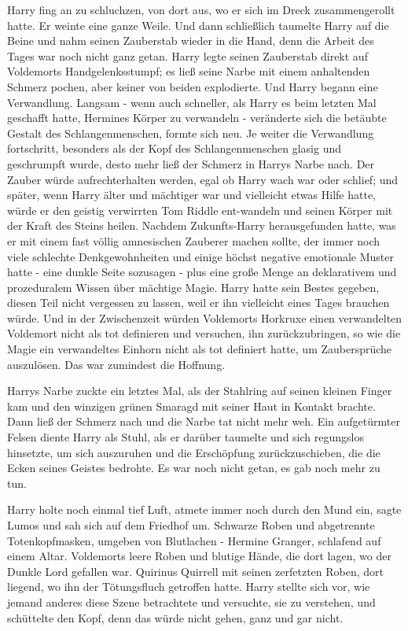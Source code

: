 Harry fing an zu schluchzen, von dort aus, wo er sich im Dreck zusammengerollt
hatte. Er weinte eine ganze Weile. Und dann schließlich taumelte Harry auf die
Beine und nahm seinen Zauberstab wieder in die Hand, denn die Arbeit des Tages
war noch nicht ganz getan. Harry legte seinen Zauberstab direkt auf Voldemorts
Handgelenksstumpf; es ließ seine Narbe mit einem anhaltenden Schmerz pochen,
aber keiner von beiden explodierte. Und Harry begann eine Verwandlung. Langsam -
wenn auch schneller, als Harry es beim letzten Mal geschafft hatte, Hermines
Körper zu verwandeln - veränderte sich die betäubte Gestalt des
Schlangenmenschen, formte sich neu. Je weiter die Verwandlung fortschritt,
besonders als der Kopf des Schlangenmenschen glasig und geschrumpft wurde, desto
mehr ließ der Schmerz in Harrys Narbe nach. Der Zauber würde aufrechterhalten
werden, egal ob Harry wach war oder schlief; und später, wenn Harry älter und
mächtiger war und vielleicht etwas Hilfe hatte, würde er den geistig verwirrten
Tom Riddle ent-wandeln und seinen Körper mit der Kraft des Steins heilen.
Nachdem Zukunfts-Harry herausgefunden hatte, was er mit einem fast völlig
amnesischen Zauberer machen sollte, der immer noch viele schlechte
Denkgewohnheiten und einige höchst negative emotionale Muster hatte - eine
dunkle Seite sozusagen - plus eine große Menge an deklarativem und prozeduralem
Wissen über mächtige Magie. Harry hatte sein Bestes gegeben, diesen Teil nicht
vergessen zu lassen, weil er ihn vielleicht eines Tages brauchen würde. Und in
der Zwischenzeit würden Voldemorts Horkruxe einen verwandelten Voldemort nicht
als tot definieren und versuchen, ihn zurückzubringen, so wie die Magie ein
verwandeltes Einhorn nicht als tot definiert hatte, um Zaubersprüche auszulösen.
Das war zumindest die Hoffnung.

Harrys Narbe zuckte ein letztes Mal, als der Stahlring auf seinen kleinen Finger
kam und den winzigen grünen Smaragd mit seiner Haut in Kontakt brachte. Dann
ließ der Schmerz nach und die Narbe tat nicht mehr weh. Ein aufgetürmter Felsen
diente Harry als Stuhl, als er darüber taumelte und sich regungslos hinsetzte,
um sich auszuruhen und die Erschöpfung zurückzuschieben, die die Ecken seines
Geistes bedrohte. Es war noch nicht getan, es gab noch mehr zu tun.

Harry holte noch einmal tief Luft, atmete immer noch durch den Mund ein, sagte
\glqq{}Lumos\grqq{} und sah sich auf dem Friedhof um. Schwarze Roben und
abgetrennte Totenkopfmasken, umgeben von Blutlachen - Hermine Granger, schlafend
auf einem Altar. Voldemorts leere Roben und blutige Hände, die dort lagen, wo
der Dunkle Lord gefallen war. Quirinus Quirrell mit seinen zerfetzten Roben,
dort liegend, wo ihn der Tötungsfluch getroffen hatte. Harry stellte sich vor,
wie jemand anderes diese Szene betrachtete und versuchte, sie zu verstehen, und
schüttelte den Kopf, denn das würde nicht gehen, ganz und gar nicht.

